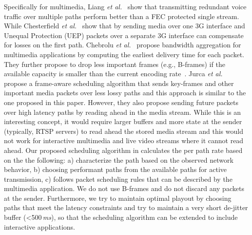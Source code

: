 Specifically for multimedia, Liang \emph{et al.}~\cite{Liang01} show that
transmitting redundant voice traffic over multiple paths perform better than a
FEC protected single stream. While Chesterfield \emph{et al.}~\cite{1498479}
show that by sending media over one 3G interface and Unequal Protection (UEP)
packets over a separate 3G interface can compensate for losses on the first
path. Chebrolu \emph{et al.}~\cite{1599407} propose bandwidth aggregation for
multimedia applications by computing the earliest delivery time for each
packet. They further propose to drop less important frames (e.g., B-frames) if
the available capacity is smaller than the current encoding
rate~\cite{1313320}. Jurca \emph{et al.}~\cite{4130370:jurca} propose a
frame-aware scheduling algorithm that sends key-frames and other important
media packets over less lossy paths and this approach is similar to the one
proposed in this paper. However, they also propose sending future packets over
high latency paths by reading ahead in the media stream. While this is an
interesting concept, it would require larger buffers and more state at the
sender (typically, RTSP servers) to read ahead the stored media stream and
this would not work for interactive multimedia and live video streams where it
cannot read ahead. Our proposed scheduling algorithm in 
calculates the per path rate based on the the following: a) characterize the
path based on the observed network behavior, b) choosing performant paths from
the available paths for active transmission, c) follows packet scheduling
rules that can be described by the multimedia application. We do not use
B-frames and do not discard any packets at the sender. Furthermore, we try to
maintain optimal playout by choosing paths that meet the latency constraints
and try to maintain a very short de-jitter buffer (<500\,\emph{ms}), so that
the scheduling algorithm can be extended to include interactive applications.


